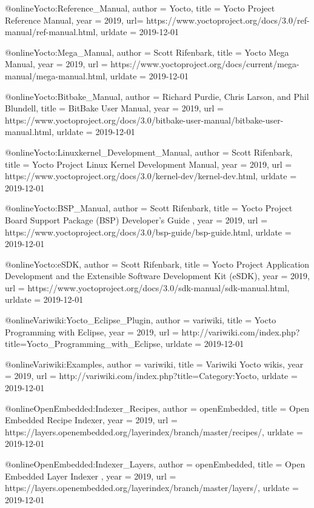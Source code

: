 @online{Yocto:Reference_Manual,
author = {Yocto},
title = {Yocto Project Reference Manual},
year = 2019,
url= {https://www.yoctoproject.org/docs/3.0/ref-manual/ref-manual.html},
urldate = {2019-12-01}
}


@online{Yocto:Mega_Manual,
author = {Scott Rifenbark},
title = {Yocto Mega Manual},
year = 2019,
url = {https://www.yoctoproject.org/docs/current/mega-manual/mega-manual.html},
urldate = {2019-12-01}
}


@online{Yocto:Bitbake_Manual,
author = {Richard Purdie, Chris Larson, and Phil Blundell},
title = {BitBake User Manual},
year = 2019,
url = {https://www.yoctoproject.org/docs/3.0/bitbake-user-manual/bitbake-user-manual.html},
urldate = {2019-12-01}
}

@online{Yocto:Linuxkernel_Development_Manual,
author = {Scott Rifenbark},
title = {Yocto Project Linux Kernel Development Manual},
year = 2019,
url = {https://www.yoctoproject.org/docs/3.0/kernel-dev/kernel-dev.html},
urldate = {2019-12-01}
}


@online{Yocto:BSP_Manual,
author = {Scott Rifenbark},
title = {Yocto Project Board Support Package (BSP) Developer's Guide },
year = 2019,
url = {https://www.yoctoproject.org/docs/3.0/bsp-guide/bsp-guide.html},
urldate = {2019-12-01}
}


@online{Yocto:eSDK,
author = {Scott Rifenbark},
title = {Yocto Project Application Development and the Extensible Software Development Kit (eSDK)},
year = 2019,
url = {https://www.yoctoproject.org/docs/3.0/sdk-manual/sdk-manual.html},
urldate = {2019-12-01}
}




@online{Variwiki:Yocto_Eclipse_Plugin,
author = {variwiki},
title = {Yocto Programming with Eclipse},
year = 2019,
url = {http://variwiki.com/index.php?title=Yocto_Programming_with_Eclipse},
urldate = {2019-12-01}
}


@online{Variwiki:Examples,
author = {variwiki},
title = {Variwiki Yocto wikis},
year = 2019,
url = {http://variwiki.com/index.php?title=Category:Yocto},
urldate = {2019-12-01}
}


@online{OpenEmbedded:Indexer_Recipes,
author = {openEmbedded},
title = {Open Embedded Recipe Indexer},
year = 2019,
url = {https://layers.openembedded.org/layerindex/branch/master/recipes/},
urldate = {2019-12-01}
}


@online{OpenEmbedded:Indexer_Layers,
author = {openEmbedded},
title = {Open Embedded Layer Indexer },
year = 2019,
url = {https://layers.openembedded.org/layerindex/branch/master/layers/},
urldate = {2019-12-01}
}


